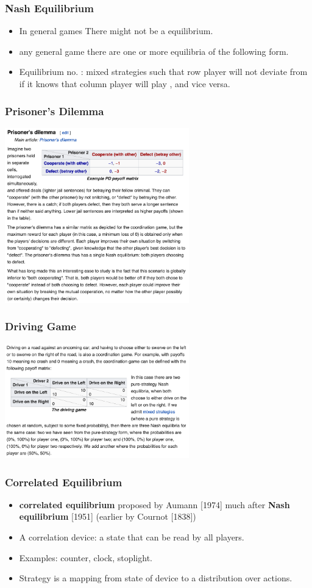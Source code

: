 \documentclass[handout]{beamer}
\begin{document}
\begin{frame}
\frametitle{Nash Equilibrium}
\begin{itemize}
\item In general games There might not be a 
  equilibrium.
\item {} any general game there are one or more equilibria
  of the following form.
\item Equilibrium no. : mixed strategies  such that row
  player will not deviate from  if it knows that column player
  will play , and vice versa.
\end{itemize}
\end{frame}

\begin{frame}
  \frametitle{Prisoner's Dilemma}
  \includegraphics[width=8cm]{figures/PrisonersDilemma.png}
\end{frame}

\begin{frame}
  \frametitle{Driving Game}
  \includegraphics[width=8cm]{figures/DrivingGame.png}
\end{frame}

\begin{frame}
  \frametitle{Correlated Equilibrium}
  \begin{itemize}
  \item {\bf correlated equilibrium} proposed by Aumann [1974] much
    after {\bf Nash equilibrium} [1951] (earlier by Cournot [1838])
  \item A correlation device: a state that can be read by all players.
  \item Examples: counter, clock, stoplight.
  \item Strategy is a mapping from state of device to a distribution
    over actions.
  \end{itemize}
\end{frame}
\end{document}
